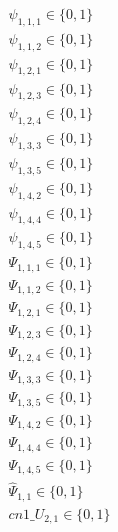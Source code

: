 \documentclass[]{article}
\begin{document}
\begin{align*}
 & \psi_{1,1,1} \in \{0, 1\}\\
 & \psi_{1,1,2} \in \{0, 1\}\\
 & \psi_{1,2,1} \in \{0, 1\}\\
 & \psi_{1,2,3} \in \{0, 1\}\\
 & \psi_{1,2,4} \in \{0, 1\}\\
 & \psi_{1,3,3} \in \{0, 1\}\\
 & \psi_{1,3,5} \in \{0, 1\}\\
 & \psi_{1,4,2} \in \{0, 1\}\\
 & \psi_{1,4,4} \in \{0, 1\}\\
 & \psi_{1,4,5} \in \{0, 1\}\\
 & \Psi_{1,1,1} \in \{0, 1\}\\
 & \Psi_{1,1,2} \in \{0, 1\}\\
 & \Psi_{1,2,1} \in \{0, 1\}\\
 & \Psi_{1,2,3} \in \{0, 1\}\\
 & \Psi_{1,2,4} \in \{0, 1\}\\
 & \Psi_{1,3,3} \in \{0, 1\}\\
 & \Psi_{1,3,5} \in \{0, 1\}\\
 & \Psi_{1,4,2} \in \{0, 1\}\\
 & \Psi_{1,4,4} \in \{0, 1\}\\
 & \Psi_{1,4,5} \in \{0, 1\}\\
 & \hat{\Psi}_{1,1} \in \{0, 1\}\\
 & cn1\_U_{2,1} \in \{0, 1\}\\
\end{align*} 
\end{document}
